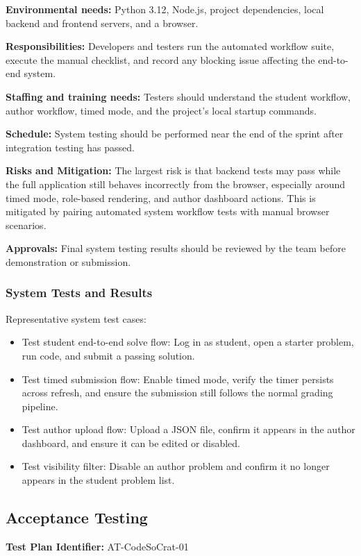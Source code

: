 \textbf{Environmental needs:}
Python 3.12, Node.js, project dependencies, local backend and frontend servers, and a browser.

\textbf{Responsibilities:}
Developers and testers run the automated workflow suite, execute the manual checklist, and record any blocking issue affecting the end-to-end system.

\textbf{Staffing and training needs:}
Testers should understand the student workflow, author workflow, timed mode, and the project's local startup commands.

\textbf{Schedule:}
System testing should be performed near the end of the sprint after integration testing has passed.

\textbf{Risks and Mitigation:}
The largest risk is that backend tests may pass while the full application still behaves incorrectly from the browser, especially around timed mode, role-based rendering, and author dashboard actions. This is mitigated by pairing automated system workflow tests with manual browser scenarios.

\textbf{Approvals:}
Final system testing results should be reviewed by the team before demonstration or submission.

\subsubsection{System Tests and Results}
Representative system test cases:
\begin{itemize}
    \item Test student end-to-end solve flow: Log in as student, open a starter problem, run code, and submit a passing solution.
    \item Test timed submission flow: Enable timed mode, verify the timer persists across refresh, and ensure the submission still follows the normal grading pipeline.
    \item Test author upload flow: Upload a JSON file, confirm it appears in the author dashboard, and ensure it can be edited or disabled.
    \item Test visibility filter: Disable an author problem and confirm it no longer appears in the student problem list.
\end{itemize}

\subsection{Acceptance Testing}
\textbf{Test Plan Identifier:}
AT-CodeSoCrat-01

